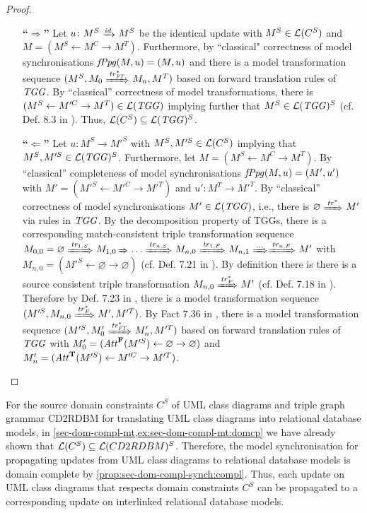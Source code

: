 \begin{proof}
\begin{enumerate}
  \item[\textbf{``$\Rightarrow$''}] Let $u\colon M^S \trans{\id} M^S$ be the identical update with $M^S \in \mathcal{L}(C^S)$ and $M=(M^S \gets M^C \to M^T)$.
  Furthermore, by ``classical" correctness of model synchronisations $\mathit{fPpg}(M,u)=(M,u)$ and there is a model transformation sequence $(M^S,M_0 \Trans{\tr^*_{\FT}} M_n,M^T)$ based on forward translation rules of $\mathit{TGG}$.
  By ``classical'' correctness of model transformations, there is $(M^S \gets M'^C \to M^T) \in \mathcal{L}(\mathit{TGG})$ implying further that $M^S \in \mathcal{L}(\mathit{TGG})^S$ (cf. Def. 8.3 in \cite{FAGT2}).
  Thus, $\mathcal{L}(C^S) \subseteq \mathcal{L}(\mathit{TGG})^S$.
  \item[\textbf{``$\Leftarrow$''}] 
  Let $u\colon M^S \to M'^S$ with $M^S,M'^S \in \mathcal{L}(C^S)$ implying that $M^S,M'^S \in \mathcal{L}(\mathit{TGG})^S$.
  Furthermore, let $M=(M^S \gets M^C \to M^T)$.
  By ``classical'' completeness of model synchronisations $\mathit{fPpg}(M,u)=(M',u')$ with $M'=(M'^S \gets M'^C \to M'^T)$ and $u'\colon M^T \to M'^T$.
  By ``classical'' correctness of model synchronisations $M' \in \mathcal{L}(\mathit{TGG})$, i.e., there is $\varnothing \Trans{\tr^*} M'$ via rules in $\mathit{TGG}$.
  By the decomposition property of TGGs, there is a corresponding match-consistent triple transformation sequence $M_{0,0}=\varnothing \Trans{\tr_{1,S}} M_{1,0} \Trans{} \ldots \Trans{\tr_{n,S}} M_{n,0} \Trans{\tr_{1,F}} M_{n,1} \Trans \ldots \Trans{\tr_{n,F}} M'$ with $M_{n,0}=(M'^S \gets \varnothing \to \varnothing)$ (cf. Def. 7.21 in \cite{FAGT2}).
  By definition there is there is a source consistent triple transformation $M_{n,0} \Trans{\tr^*_F} M'$ (cf. Def. 7.18 in \cite{FAGT2}).
  Therefore by Def. 7.23 in \cite{FAGT2}, there is a model transformation sequence $(M'^S,M_{n,0} \Trans{\tr^*_F} M',M'^T)$.
  By Fact 7.36 in \cite{FAGT2}, there is a model transformation sequence $(M'^S,M'_0 \Trans{\tr^*_{\FT}} M'_n,M'^T)$ based on forward translation rules of $\mathit{TGG}$ with $M'_0=(\mathit{Att}^\mathbf{F}(M'^S) \gets \varnothing \to \varnothing)$ and $M'_n=(\mathit{Att}^\mathbf{T}(M'^S) \gets M'^C \to M'^T)$.
\end{enumerate}
\end{proof}

\begin{example}
For the source domain constraints $C^S$ of UML class diagrams and triple graph grammar CD2RDBM for translating UML class diagrams into relational database models, in \cref{sec-dom-compl-mt,ex:sec-dom-compl-mt:domcp} we have already shown that $\mathcal{L}(C^S) \subseteq \mathcal{L}(CD2RDBM)^S$.
Therefore, the model synchronisation for propagating updates from UML class diagrams to relational database models is domain complete by \cref{prop:sec-dom-compl-synch:compl}.
Thus, each update on UML class diagrams that respects domain constraints $C^S$ can be propagated to a corresponding update on interlinked relational database models.
\envEndMarker
\end{example}